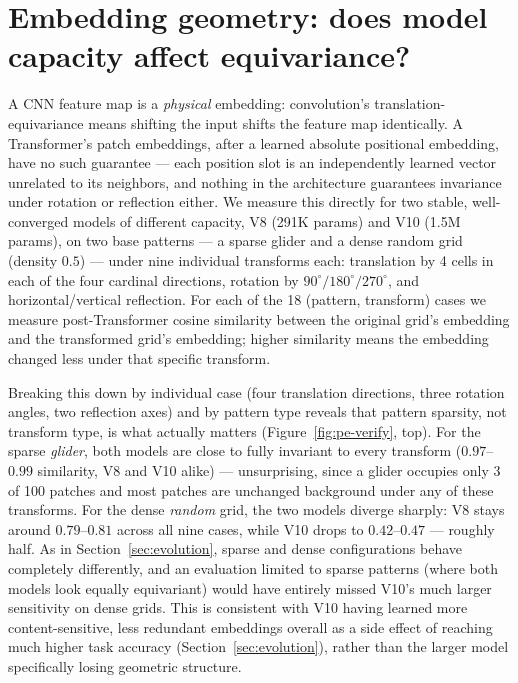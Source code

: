 \documentclass{article}
\begin{document}
\section{Embedding geometry: does model capacity affect equivariance?}
\label{sec:embed}

A CNN feature map is a \emph{physical} embedding: convolution's
translation-equivariance means shifting the input shifts the feature map
identically. A Transformer's patch embeddings, after a learned absolute
positional embedding, have no such guarantee --- each position slot is an
independently learned vector unrelated to its neighbors, and nothing in
the architecture guarantees invariance under rotation or reflection
either. We measure this directly for two stable, well-converged models of
different capacity, V8 (291K params) and V10 (1.5M params), on two base
patterns --- a sparse glider and a dense random grid (density $0.5$) ---
under nine individual transforms each: translation by 4 cells in each of
the four cardinal directions, rotation by $90^\circ/180^\circ/270^\circ$,
and horizontal/vertical reflection. For each of the 18 (pattern, transform)
cases we measure post-Transformer cosine similarity between the original
grid's embedding and the transformed grid's embedding; higher similarity
means the embedding changed less under that specific transform.

Breaking this down by individual case (four translation directions,
three rotation angles, two reflection axes) and by pattern type reveals
that pattern sparsity, not transform type, is what actually matters
(Figure~\ref{fig:pe-verify}, top). For the sparse \emph{glider}, both
models are close to fully invariant to every transform ($0.97$--$0.99$
similarity, V8 and V10 alike) --- unsurprising, since a glider occupies
only 3 of 100 patches and most patches are unchanged background under
any of these transforms. For the dense \emph{random} grid, the two
models diverge sharply: V8 stays around $0.79$--$0.81$ across all nine
cases, while V10 drops to $0.42$--$0.47$ --- roughly half. As in
Section~\ref{sec:evolution}, sparse and dense configurations behave
completely differently, and an evaluation limited to sparse patterns
(where both models look equally equivariant) would have entirely missed
V10's much larger sensitivity on dense grids. This is consistent with
V10 having learned more content-sensitive, less redundant embeddings
overall as a side effect of reaching much higher task accuracy
(Section~\ref{sec:evolution}), rather than the larger model specifically
losing geometric structure.
\end{document}
